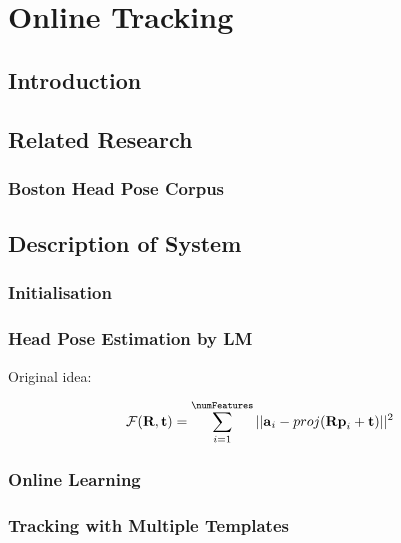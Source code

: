 
\def\meshpos{\textbf{p}}
\def\templatepos{\textbf{a}}

\chapter[Online Tracking]{Online Tracking}
\label{ChapterOnlineTracking}

\section{Introduction}

\section{Related Research}

\subsection{Boston Head Pose Corpus}

\section{Description of System}

\subsection{Initialisation}

\subsection{Head Pose Estimation by LM}
\label{SectionLmHeadPose}

Original idea: \cite{Liu2000}

\begin{equation}
\mathcal{F}(\textbf{R},\textbf{t}) = \displaystyle\sum_{i=1}^{\numFeatures} { ||\textbf{\templatepos}_{i} - proj(\textbf{R} \textbf{\meshpos}_i + \textbf{t})||^2 }
\label {LmPoseEquation}
\end{equation}

\subsection{Online Learning}

\subsection{Tracking with Multiple Templates}

